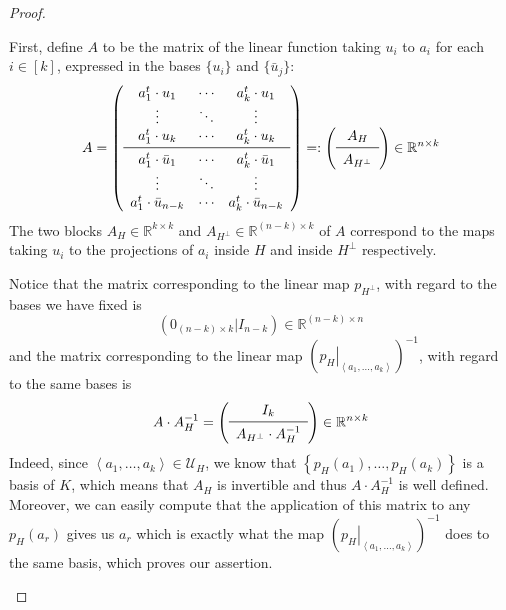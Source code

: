 \begin{proof}
\begin{b_item}
First, define $A$ to be the matrix of the linear function taking $u_i$ to $a_i$ for each $i\in[k]$, expressed in the bases $\{u_i\}$ and $\{\bar{u}_j\}$:
\[A=\left(\begin{array}{ccc}
a^t_1\cdot u_1&\cdots&a^t_k\cdot u_1\\
\vdots&\ddots&\vdots\\
a^t_1\cdot u_k&\cdots&a^t_k\cdot u_k\\
\midrule
a^t_1\cdot \bar{u}_1&\cdots&a^t_k\cdot \bar{u}_1\\
\vdots&\ddots&\vdots\\
a^t_1\cdot \bar{u}_{n-k}&\cdots&a^t_k\cdot \bar{u}_{n-k}\\
\end{array}\right)=:
\left(\begin{array}{c}A_H\\\midrule A_{H^{\perp}}\\
\end{array}\right)
\in\mathbb{R}^{n\times{k}}\]
The two blocks $A_H\in\mathbb{R}^{k\times k}$ and $A_{H^{\perp}}\in\mathbb{R}^{(n-k)\times k}$ of $A$ correspond to the maps taking $u_i$ to the projections of $a_i$ inside $H$ and inside $H^{\perp}$ respectively.

Notice that the matrix corresponding to the linear map $p_{H^{\perp}}$, with regard to the bases we have fixed is
\[\left(0_{(n-k)\times k}|I_{n-k}\right)\in\mathbb{R}^{(n-k)\times n}\]
and the matrix corresponding to the linear map ${\left(\left.p_H\right|_{\left<a_1,\ldots,a_k\right>}\right)}^{-1}$, with regard to the same bases is
\[A\cdot A_H^{-1}=\left(\begin{array}{c}
I_k\\
\midrule
A_{H^{\perp}}\cdot A_H^{-1}\\
\end{array}\right)
\in\mathbb{R}^{n\times{k}}\]
Indeed, since $\left<a_1,\ldots,a_k\right>\in\mathcal{U}_H$, we know that $\left\{p_H(a_1),\ldots,p_H(a_k)\right\}$ is a basis of $K$, which means that $A_H$ is invertible and thus $A\cdot A_H^{-1}$ is well defined. Moreover, we can easily compute that the application of this matrix to any $p_H(a_r)$ gives us $a_r$ which is exactly what the map ${\left({\left.p_H\right|}_{\left<a_1,\ldots,a_k\right>}\right)}^{-1}$ does to the same basis, which proves our assertion.


\end{b_item}
\end{proof}
